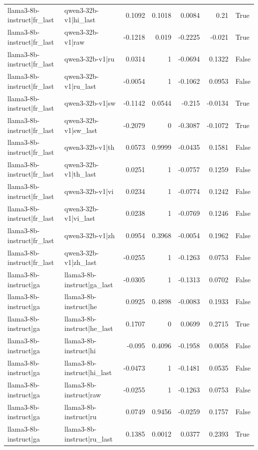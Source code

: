 \begin{table}
\begin{tabular}{l l r r r r l}
llama3-8b-instruct|fr_last & qwen3-32b-v1|hi_last & 0.1092 & 0.1018 & 0.0084 & 0.21 & True \\
llama3-8b-instruct|fr_last & qwen3-32b-v1|raw & -0.1218 & 0.019 & -0.2225 & -0.021 & True \\
llama3-8b-instruct|fr_last & qwen3-32b-v1|ru & 0.0314 & 1 & -0.0694 & 0.1322 & False \\
llama3-8b-instruct|fr_last & qwen3-32b-v1|ru_last & -0.0054 & 1 & -0.1062 & 0.0953 & False \\
llama3-8b-instruct|fr_last & qwen3-32b-v1|sw & -0.1142 & 0.0544 & -0.215 & -0.0134 & True \\
llama3-8b-instruct|fr_last & qwen3-32b-v1|sw_last & -0.2079 & 0 & -0.3087 & -0.1072 & True \\
llama3-8b-instruct|fr_last & qwen3-32b-v1|th & 0.0573 & 0.9999 & -0.0435 & 0.1581 & False \\
llama3-8b-instruct|fr_last & qwen3-32b-v1|th_last & 0.0251 & 1 & -0.0757 & 0.1259 & False \\
llama3-8b-instruct|fr_last & qwen3-32b-v1|vi & 0.0234 & 1 & -0.0774 & 0.1242 & False \\
llama3-8b-instruct|fr_last & qwen3-32b-v1|vi_last & 0.0238 & 1 & -0.0769 & 0.1246 & False \\
llama3-8b-instruct|fr_last & qwen3-32b-v1|zh & 0.0954 & 0.3968 & -0.0054 & 0.1962 & False \\
llama3-8b-instruct|fr_last & qwen3-32b-v1|zh_last & -0.0255 & 1 & -0.1263 & 0.0753 & False \\
llama3-8b-instruct|ga & llama3-8b-instruct|ga_last & -0.0305 & 1 & -0.1313 & 0.0702 & False \\
llama3-8b-instruct|ga & llama3-8b-instruct|he & 0.0925 & 0.4898 & -0.0083 & 0.1933 & False \\
llama3-8b-instruct|ga & llama3-8b-instruct|he_last & 0.1707 & 0 & 0.0699 & 0.2715 & True \\
llama3-8b-instruct|ga & llama3-8b-instruct|hi & -0.095 & 0.4096 & -0.1958 & 0.0058 & False \\
llama3-8b-instruct|ga & llama3-8b-instruct|hi_last & -0.0473 & 1 & -0.1481 & 0.0535 & False \\
llama3-8b-instruct|ga & llama3-8b-instruct|raw & -0.0255 & 1 & -0.1263 & 0.0753 & False \\
llama3-8b-instruct|ga & llama3-8b-instruct|ru & 0.0749 & 0.9456 & -0.0259 & 0.1757 & False \\
llama3-8b-instruct|ga & llama3-8b-instruct|ru_last & 0.1385 & 0.0012 & 0.0377 & 0.2393 & True \\

\end{tabular}
\end{table}
